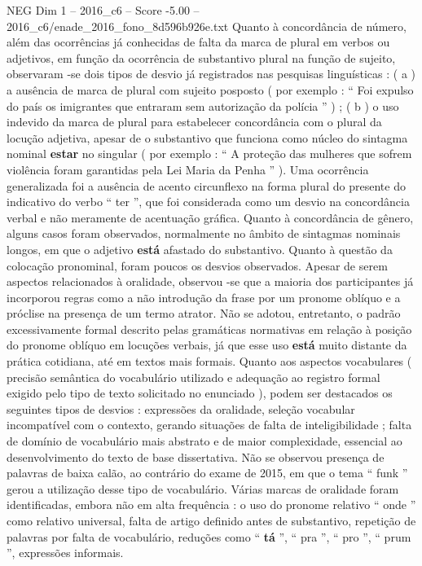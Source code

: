 \begin{textsample}{NEG Dim 1 – 2016\_c6 – Score -5.00 – 2016\_c6/enade\_2016\_fono\_8d596b926e.txt}
Quanto à concordância de número, além das ocorrências já conhecidas de falta da marca de plural em verbos ou adjetivos, em função da ocorrência de substantivo plural na função de sujeito, observaram -se dois tipos de desvio já registrados nas pesquisas linguísticas : ( a ) a ausência de marca de plural com sujeito posposto ( por exemplo : “ Foi expulso do país os imigrantes que entraram sem autorização da polícia ” ) ; ( b ) o uso indevido da marca de plural para estabelecer concordância com o plural da locução adjetiva, apesar de o substantivo que funciona como núcleo do sintagma nominal \textbf{estar} no singular ( por exemplo : “ A proteção das mulheres que sofrem violência foram garantidas pela Lei Maria da Penha ” ).
Uma ocorrência generalizada foi a ausência de acento circunflexo na forma plural do presente do indicativo do verbo “ ter ”, que foi considerada como um desvio na concordância verbal e não meramente de acentuação gráfica.
Quanto à concordância de gênero, alguns casos foram observados, normalmente no âmbito de sintagmas nominais longos, em que o adjetivo \textbf{está} afastado do substantivo.
Quanto à questão da colocação pronominal, foram poucos os desvios observados.
Apesar de serem aspectos relacionados à oralidade, observou -se que a maioria dos participantes já incorporou regras como a não introdução da frase por um pronome oblíquo e a próclise na presença de um termo atrator.
Não se adotou, entretanto, o padrão excessivamente formal descrito pelas gramáticas normativas em relação à posição do pronome oblíquo em locuções verbais, já que esse uso \textbf{está} muito distante da prática cotidiana, até em textos mais formais.
Quanto aos aspectos vocabulares ( precisão semântica do vocabulário utilizado e adequação ao registro formal exigido pelo tipo de texto solicitado no enunciado ), podem ser destacados os seguintes tipos de desvios : expressões da oralidade, seleção vocabular incompatível com o contexto, gerando situações de falta de inteligibilidade ; falta de domínio de vocabulário mais abstrato e de maior complexidade, essencial ao desenvolvimento do texto de base dissertativa.
Não se observou presença de palavras de baixa calão, ao contrário do exame de 2015, em que o tema “ funk ” gerou a utilização desse tipo de vocabulário.
Várias marcas de oralidade foram identificadas, embora não em alta frequência : o uso do pronome relativo “ onde ” como relativo universal, falta de artigo definido antes de substantivo, repetição de palavras por falta de vocabulário, reduções como “ \textbf{tá} ”, “ pra ”, “ pro ”, “ prum ”, expressões informais.

\end{textsample}
